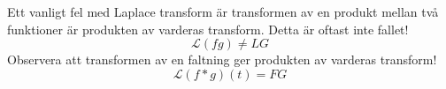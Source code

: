 \documentclass{article}
\begin{document}
Ett vanligt fel med Laplace transform är transformen av en produkt mellan två funktioner är produkten av varderas transform. 
Detta är oftast inte fallet! 
$$\mathcal{L} (f g) \neq L G $$
Observera att transformen av en faltning ger produkten av varderas transform!
$$\mathcal{L} (f*g) (t) = F G $$
\appendix
\end{document}

